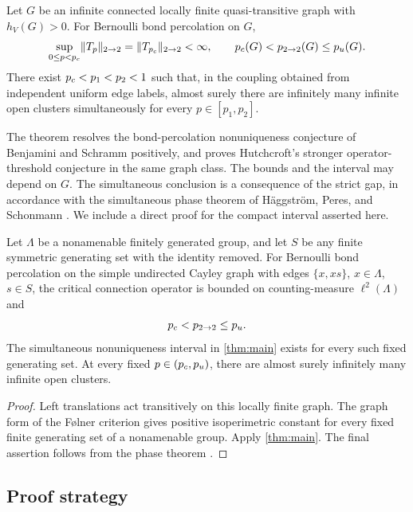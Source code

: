 \begin{theorem}\label{thm:main}
Let $G$ be an infinite connected locally finite quasi-transitive graph
with $h_V(G)>0$. For Bernoulli bond percolation on $G$,
\[
 \sup_{0\le p<{p_c}}\lVert T_p\rVert_{2\to2}
       =\lVert T_{{p_c}}\rVert_{2\to2}<\infty,
 \qquad {p_c}(G)<{p_{2\to2}}(G)\le{p_u}(G).
\]
There exist ${p_c}<p_1<p_2<1$ such that, in the coupling obtained from
independent uniform edge labels, almost surely there are infinitely
many infinite open clusters simultaneously for every $p\in[p_1,p_2]$.
\end{theorem}

The theorem resolves the bond-percolation nonuniqueness conjecture of
Benjamini and Schramm positively, and proves Hutchcroft's stronger
operator-threshold conjecture in the same graph class. The bounds and
the interval may depend on $G$. The simultaneous conclusion is a
consequence of the strict gap, in accordance with the simultaneous
phase theorem of H\"aggstr\"om, Peres, and Schonmann
\cite[Theorem~1.3]{HaggstromPeresSchonmann1999}. We include a direct
proof for the compact interval asserted here.

\begin{corollary}\label{cor:cayley}
Let $\Lambda$ be a nonamenable finitely generated group, and let $S$
be any finite symmetric generating set with the identity removed.
For Bernoulli bond percolation on the simple undirected Cayley graph
with edges $\{x,xs\}$, $x\in\Lambda$, $s\in S$, the critical connection
operator is bounded on counting-measure $\ell^2(\Lambda)$ and
\[
 {p_c}<{p_{2\to2}}\le{p_u}.
\]
The simultaneous nonuniqueness interval in \cref{thm:main} exists for
every such fixed generating set. At every fixed $p\in({p_c},{p_u})$,
there are almost surely infinitely many infinite open clusters.
\end{corollary}

\begin{proof}
Left translations act transitively on this locally finite graph.
The graph form of the F\o lner criterion gives positive isoperimetric
constant for every fixed finite generating set of a nonamenable group.
Apply \cref{thm:main}.
The final assertion follows from the phase theorem
\cite[Theorem~1.3]{HaggstromPeresSchonmann1999}.
\end{proof}

\subsection{Proof strategy}

